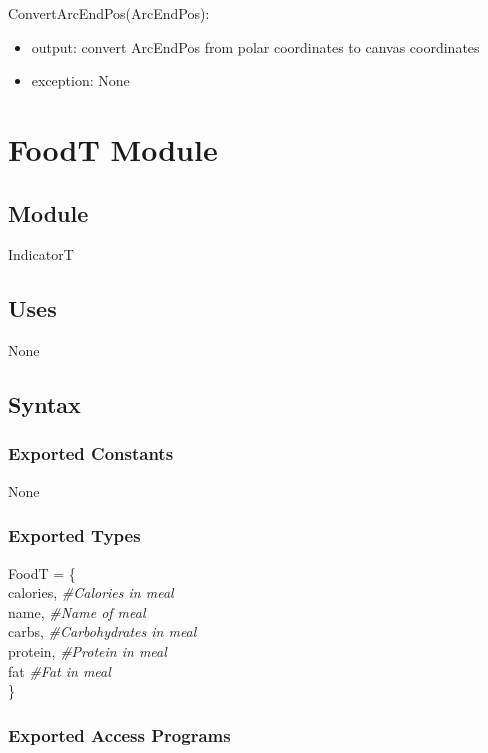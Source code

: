 \documentclass[12pt, titlepage]{article}
\begin{document}
\noindent ConvertArcEndPos(ArcEndPos):
\begin{itemize}
	\item output: convert ArcEndPos from polar coordinates to canvas coordinates 
	\item exception: None 
\end{itemize}

\newpage

\section {FoodT Module} \label{Module} 

\subsection{Module}

IndicatorT

\subsection {Uses}

None

\subsection {Syntax}

\subsubsection {Exported Constants}

None

\subsubsection {Exported Types}

FoodT = \{\\
    calories, \textit{\#Calories in meal}\\
    name, \textit{\#Name of meal}\\
    carbs, \textit{\#Carbohydrates in meal}\\
    protein, \textit{\#Protein in meal}\\
    fat \textit{\#Fat in meal}\\
\}

\subsubsection {Exported Access Programs}
\end{document}
